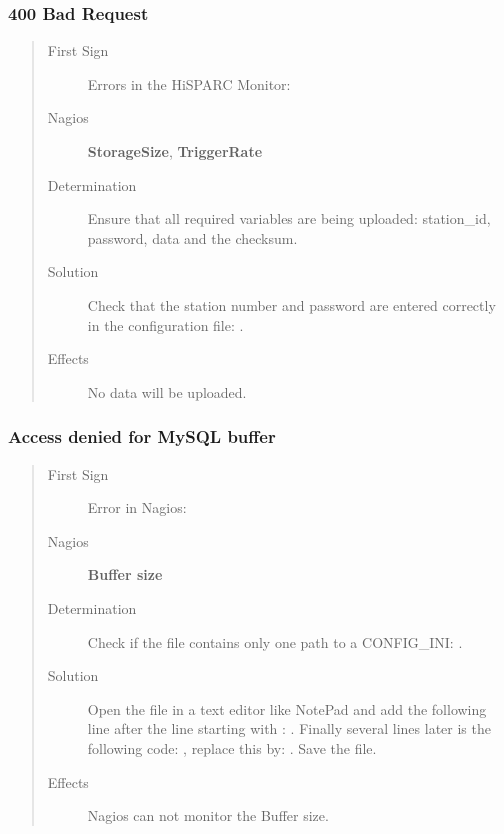 \documentclass[a4paper,11pt,english]{sphinxmanual}
\begin{document}
\subsubsection{400 Bad Request}
\label{known-issues:bad-request}\begin{quote}\begin{description}
\item[{First Sign}] \leavevmode
Errors in the HiSPARC Monitor: 

\item[{Nagios}] \leavevmode
\textbf{StorageSize}, \textbf{TriggerRate}

\item[{Determination}] \leavevmode
Ensure that all required variables are being uploaded:
station\_id, password, data and the checksum.

\item[{Solution}] \leavevmode
Check that the station number and password are entered
correctly in the configuration file:
.

\item[{Effects}] \leavevmode
No data will be uploaded.

\end{description}\end{quote}


\subsubsection{Access denied for MySQL buffer}
\label{known-issues:access-denied-for-mysql-buffer}\begin{quote}\begin{description}
\item[{First Sign}] \leavevmode
Error in Nagios: 

\item[{Nagios}] \leavevmode
\textbf{Buffer size}

\item[{Determination}] \leavevmode
Check if the file 
contains only one path to a CONFIG\_INI:
.

\item[{Solution}] \leavevmode
Open the file 
in a text editor like NotePad and add the following line after
the line starting with :
.
Finally several lines later is the following code:
, replace this by:
.
Save the file.

\item[{Effects}] \leavevmode
Nagios can not monitor the Buffer size.

\end{description}\end{quote}
\end{document}
